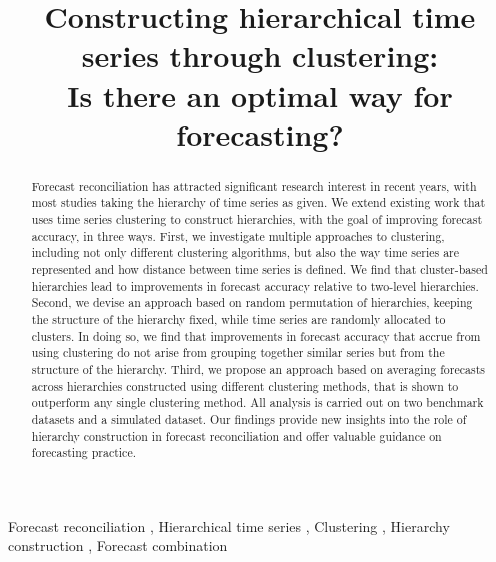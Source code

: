 \documentclass[a4paper,review,12pt,authoryear]{elsarticle}
\begin{document}
\begin{frontmatter}

\title{Constructing hierarchical time series through clustering: \\Is there an optimal way for forecasting?}




  \begin{abstract}

    Forecast reconciliation has attracted significant research interest in recent years, with most studies taking the hierarchy of time series as given. We extend existing work that uses time series clustering to construct hierarchies, with the goal of improving forecast accuracy, in three ways. First, we investigate multiple approaches to clustering, including not only different clustering algorithms, but also the way time series are represented and how distance between time series is defined. We find that cluster-based hierarchies lead to improvements in forecast accuracy relative to two-level hierarchies. Second, we devise an approach based on random permutation of hierarchies, keeping the structure of the hierarchy fixed, while time series are randomly allocated to clusters. In doing so, we find that improvements in forecast accuracy that accrue from using clustering do not arise from grouping together similar series but from the structure of the hierarchy. Third, we propose an approach based on averaging forecasts across hierarchies constructed using different clustering methods, that is shown to outperform any single clustering method. All analysis is carried out on two benchmark datasets and a simulated dataset. Our findings provide new insights into the role of hierarchy construction in forecast reconciliation and offer valuable guidance on forecasting practice. \\
    

  \end{abstract}

  \begin{keyword}
  Forecast reconciliation \sep
  Hierarchical time series \sep
  Clustering \sep
  Hierarchy construction \sep
  Forecast combination
  \end{keyword}

\end{frontmatter}
\end{document}
